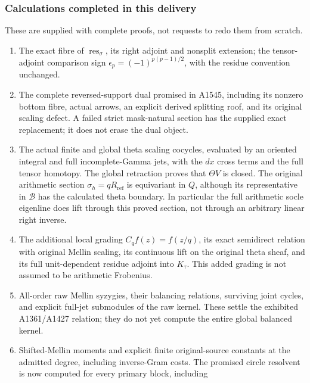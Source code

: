 \subsubsection{Calculations completed in this
delivery}\label{calculations-completed-in-this-delivery}

These are supplied with complete proofs, not requests to redo them from
scratch.

\begin{enumerate}
\def\labelenumi{\arabic{enumi}.}
\tightlist
\item
  The exact fibre of \(\operatorname{res}_\sigma\), its right adjoint
  and nonsplit extension; the tensor-adjoint comparison sign
  \(\epsilon_p=(-1)^{p(p-1)/2}\), with the residue convention unchanged.
\item
  The complete reversed-support dual promised in A1545, including its
  nonzero bottom fibre, actual arrows, an explicit derived splitting
  roof, and its original scaling defect. A failed strict mask-natural
  section has the supplied exact replacement; it does not erase the dual
  object.
\item
  The actual finite and global theta scaling cocycles, evaluated by an
  oriented integral and full incomplete-Gamma jets, with the \(dx\)
  cross terms and the full tensor homotopy. The global retraction proves
  that \(\Theta V\) is closed. The original arithmetic section
  \(\sigma_h=qR_{\mathrm{ref}}\) is equivariant in \(Q\), although its
  representative in \(\mathscr B\) has the calculated theta boundary. In
  particular the full arithmetic socle eigenline does lift through this
  proved section, not through an arbitrary linear right inverse.
\item
  The additional local grading \(C_qf(z)=f(z/q)\), its exact semidirect
  relation with original Mellin scaling, its continuous lift on the
  original theta sheaf, and its full unit-dependent residue adjoint into
  \(K_\tau\). This added grading is not assumed to be arithmetic
  Frobenius.
\item
  All-order raw Mellin syzygies, their balancing relations, surviving
  joint cycles, and explicit full-jet submodules of the raw kernel.
  These settle the exhibited A1361/A1427 relation; they do not yet
  compute the entire global balanced kernel.
\item
  Shifted-Mellin moments and explicit finite original-source constants
  at the admitted degree, including inverse-Gram costs. The promised
  circle resolvent is now computed for every primary block, including

\end{enumerate}
